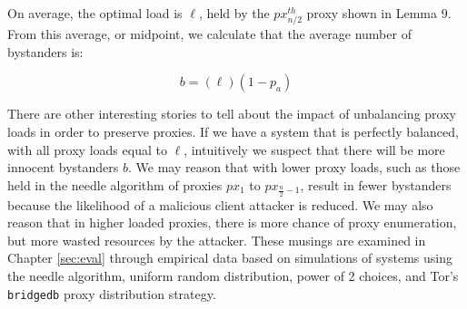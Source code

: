 On average, the optimal load is $\ell$, held by the $px_{n/2}^{th}$ proxy shown in Lemma $9$. From this average, or midpoint, we calculate that the average number of bystanders is:

$$b = (\ell)(1 - p_a)$$

There are other interesting stories to tell about the impact of unbalancing proxy loads in order to preserve proxies. If we have a system that is perfectly balanced, with all proxy loads equal to $\ell$, intuitively we suspect that there will be more innocent bystanders $b$. We may reason that with lower proxy loads, such as those held in the needle algorithm of proxies $px_1$ to $px_{\frac{n}{2}-1}$, result in fewer bystanders because the likelihood of a malicious client attacker is reduced. We may also reason that in higher loaded proxies, there is more chance of proxy enumeration, but more wasted resources by the attacker. These musings are examined in Chapter \ref{sec:eval} through empirical data based on simulations of systems using the needle algorithm, uniform random distribution, power of 2 choices, and Tor's \texttt{bridgedb} proxy distribution strategy. 